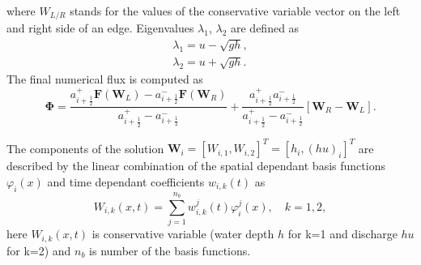 where $W_{L/R}$ stands for the values of the conservative variable vector on the left and right side of an edge. Eigenvalues $\lambda_1$, $\lambda_2$ are defined as
\begin{equation}
\begin{array}{c}
\lambda_1=u-\sqrt{gh},\\
\lambda_2=u+\sqrt{gh}.
\end{array}
\end{equation}
The final numerical flux is computed as
\begin{equation}\label{Phi}
\mathbf{\Phi}=\frac{a_{i+\frac12}^+\mathbf{F}\left(\mathbf{W}_L\right)-a_{i+\frac12}^-\mathbf{F}\left(\mathbf{W}_R\right)}{a_{i+\frac12}^+-a_{i+\frac12}^-}+\frac{a^+_{i+\frac12}a^-_{i+\frac12}}{a^+_{i+\frac12}-a^-_{i+\frac12}}\left[\mathbf{W}_R-\mathbf{W}_L\right].
\end{equation}

The components of the solution $\mathbf{W}_i=[W_{i,1},W_{i,2}]^T=[h_i,(hu)_i]^T$ are described by the linear combination of the spatial dependant basis functions $\varphi_i(x)$ and time dependant coefficients $w_{i,k}(t)$ as
\begin{equation}\label{linC}
W_{i,k}(x,t)=\sum_{j=1}^{n_b} w_{i,k}^j(t) \varphi_{i}^j(x), \quad k=1,2,
\end{equation}
here $W_{i,k}(x,t)$ is conservative variable (water depth $h$ for k=1 and discharge $hu$ for k=2) and $n_b$ is number of the basis functions.

